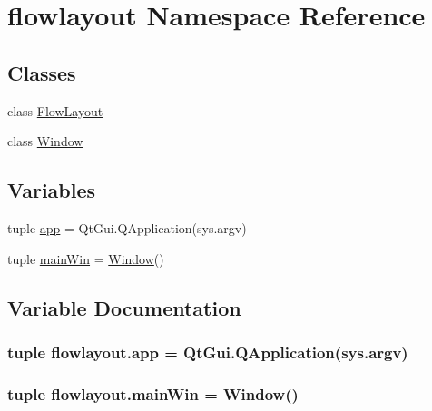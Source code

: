 \hypertarget{namespaceflowlayout}{}\section{flowlayout Namespace Reference}
\label{namespaceflowlayout}
\subsection*{Classes}
\begin{DoxyCompactItemize}
\item 
class \hyperlink{classflowlayout_1_1FlowLayout}{Flow\+Layout}
\item 
class \hyperlink{classflowlayout_1_1Window}{Window}
\end{DoxyCompactItemize}
\subsection*{Variables}
\begin{DoxyCompactItemize}
\item 
tuple \hyperlink{namespaceflowlayout_a7315c6ec6e25ead391466f41d5994e00}{app} = Qt\+Gui.\+Q\+Application(sys.\+argv)
\item 
tuple \hyperlink{namespaceflowlayout_a208a0b9185ecdcfaaf3bb413b0be0aac}{main\+Win} = \hyperlink{classflowlayout_1_1Window}{Window}()
\end{DoxyCompactItemize}


\subsection{Variable Documentation}
\hypertarget{namespaceflowlayout_a7315c6ec6e25ead391466f41d5994e00}{}
\subsubsection[{app}]{\setlength{\rightskip}{0pt plus 5cm}tuple flowlayout.\+app = Qt\+Gui.\+Q\+Application(sys.\+argv)}\label{namespaceflowlayout_a7315c6ec6e25ead391466f41d5994e00}
\hypertarget{namespaceflowlayout_a208a0b9185ecdcfaaf3bb413b0be0aac}{}
\subsubsection[{main\+Win}]{\setlength{\rightskip}{0pt plus 5cm}tuple flowlayout.\+main\+Win = {\bf Window}()}\label{namespaceflowlayout_a208a0b9185ecdcfaaf3bb413b0be0aac}
